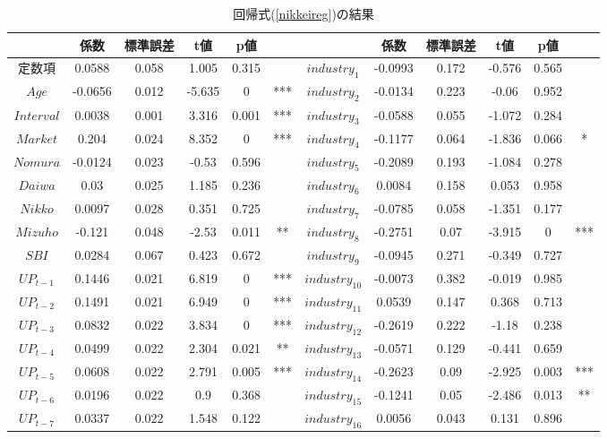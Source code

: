 \documentclass{jsarticle}
\begin{document}
\begin{table}[h]
  \begin{center}
  \caption{回帰式(\ref{nikkeireg})の結果}
  \label{tab:regnikkei}
\begin{tabular}{|c|ccccc|c|ccccc|}
\hline
 & 係数 & 標準誤差 & t値 & p値 &  &  & 係数 & 標準誤差 & t値 & p値 &  \\
 \hline\hline
定数項 & 0.0588 & 0.058 & 1.005 & 0.315 &  & $industry_{1}$ & -0.0993 & 0.172 & -0.576 & 0.565 &  \\
$Age$ & -0.0656 & 0.012 & -5.635 & 0 & *** & $industry_{2}$ & -0.0134 & 0.223 & -0.06 & 0.952 &  \\
$Interval$ & 0.0038 & 0.001 & 3.316 & 0.001 & *** & $industry_{3}$ & -0.0588 & 0.055 & -1.072 & 0.284 &  \\
$Market$ & 0.204 & 0.024 & 8.352 & 0 & *** & $industry_{4}$ & -0.1177 & 0.064 & -1.836 & 0.066 & * \\
$Nomura$ & -0.0124 & 0.023 & -0.53 & 0.596 &  & $industry_{5}$ & -0.2089 & 0.193 & -1.084 & 0.278 &  \\
$Daiwa$ & 0.03 & 0.025 & 1.185 & 0.236 &  & $industry_{6}$ & 0.0084 & 0.158 & 0.053 & 0.958 &  \\
$Nikko$ & 0.0097 & 0.028 & 0.351 & 0.725 &  & $industry_{7}$ & -0.0785 & 0.058 & -1.351 & 0.177 &  \\
$Mizuho$ & -0.121 & 0.048 & -2.53 & 0.011 & ** & $industry_{8}$ & -0.2751 & 0.07 & -3.915 & 0 & *** \\
$SBI$ & 0.0284 & 0.067 & 0.423 & 0.672 &  & $industry_{9}$ & -0.0945 & 0.271 & -0.349 & 0.727 &  \\
$UP_{t-1}$ & 0.1446 & 0.021 & 6.819 & 0 & *** & $industry_{10}$ & -0.0073 & 0.382 & -0.019 & 0.985 &  \\
$UP_{t-2}$ & 0.1491 & 0.021 & 6.949 & 0 & *** & $industry_{11}$ & 0.0539 & 0.147 & 0.368 & 0.713 &  \\
$UP_{t-3}$ & 0.0832 & 0.022 & 3.834 & 0 & *** & $industry_{12}$ & -0.2619 & 0.222 & -1.18 & 0.238 &  \\
$UP_{t-4}$ & 0.0499 & 0.022 & 2.304 & 0.021 & ** & $industry_{13}$ & -0.0571 & 0.129 & -0.441 & 0.659 &  \\
$UP_{t-5}$ & 0.0608 & 0.022 & 2.791 & 0.005 & *** & $industry_{14}$ & -0.2623 & 0.09 & -2.925 & 0.003 & *** \\
$UP_{t-6}$ & 0.0196 & 0.022 & 0.9 & 0.368 &  & $industry_{15}$ & -0.1241 & 0.05 & -2.486 & 0.013 & ** \\
$UP_{t-7}$ & 0.0337 & 0.022 & 1.548 & 0.122 &  & $industry_{16}$ & 0.0056 & 0.043 & 0.131 & 0.896 &  \\

\end{tabular}
\end{center}
\end{table}
\end{document}
